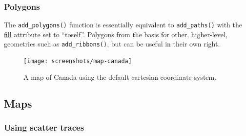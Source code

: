 \documentclass[12pt,]{isuthesis}
\newenvironment{Shaded}{\begin{snugshade}}{\end{snugshade}}
\newcommand{\KeywordTok}[1]{\textcolor[rgb]{0.13,0.29,0.53}{\textbf{{#1}}}}
\newcommand{\DataTypeTok}[1]{\textcolor[rgb]{0.13,0.29,0.53}{{#1}}}
\newcommand{\FloatTok}[1]{\textcolor[rgb]{0.00,0.00,0.81}{{#1}}}
\newcommand{\StringTok}[1]{\textcolor[rgb]{0.31,0.60,0.02}{{#1}}}
\newcommand{\OtherTok}[1]{\textcolor[rgb]{0.56,0.35,0.01}{{#1}}}
\newcommand{\NormalTok}[1]{{#1}}
\begin{document}
\hypertarget{polygons}{\subsubsection{Polygons}\label{polygons}}

The \texttt{add\_polygons()} function is essentially equivalent to
\texttt{add\_paths()} with the
\href{https://plot.ly/r/reference/\#scatter-fill}{fill} attribute set to
``toself''. Polygons from the basis for other, higher-level, geometries
such as \texttt{add\_ribbons()}, but can be useful in their own right.

\begin{Shaded}
\end{Shaded}

\begin{figure}
\centering
\texttt{[image: screenshots/map-canada]}
\caption{\label{fig:map-canada}A map of Canada using the default cartesian
coordinate system.}
\end{figure}

\subsection{Maps}\label{maps}

\subsubsection{Using scatter traces}\label{using-scatter-traces}
\end{document}
